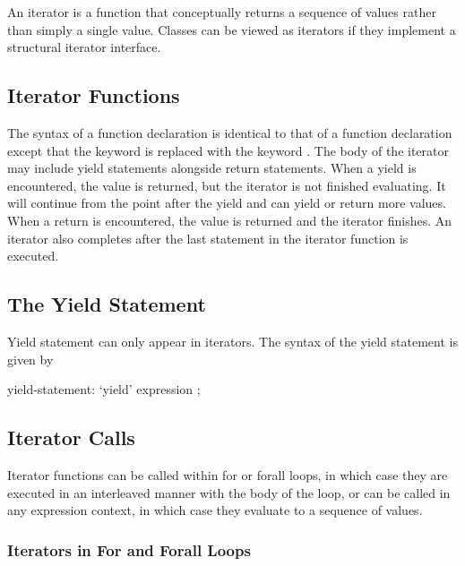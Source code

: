 \label{Iterators}

An iterator is a function that conceptually returns a sequence of
values rather than simply a single value.  Classes can be viewed as
iterators if they implement a structural iterator interface.

\subsection{Iterator Functions}
\label{Iterator_Functions}

The syntax of a function declaration is identical to that of a
function declaration except that the keyword  is replaced
with the keyword .  The body of the iterator may
include yield statements alongside return statements.  When a yield is
encountered, the value is returned, but the iterator is not finished
evaluating.  It will continue from the point after the yield and can
yield or return more values.  When a return is encountered, the value
is returned and the iterator finishes.  An iterator also completes
after the last statement in the iterator function is executed.

\subsection{The Yield Statement}
\label{The_Yield_Statement}

Yield statement can only appear in iterators.  The syntax of the yield
statement is given by
\begin{syntax}
yield-statement:
  `yield' expression ;
\end{syntax}

\subsection{Iterator Calls}
\label{Iterator_Calls}

Iterator functions can be called within for or forall loops, in which
case they are executed in an interleaved manner with the body of the
loop, or can be called in any expression context, in which case they
evaluate to a sequence of values.

\subsubsection{Iterators in For and Forall Loops}
\label{Iterators_in_For_and_Forall_Loops}

